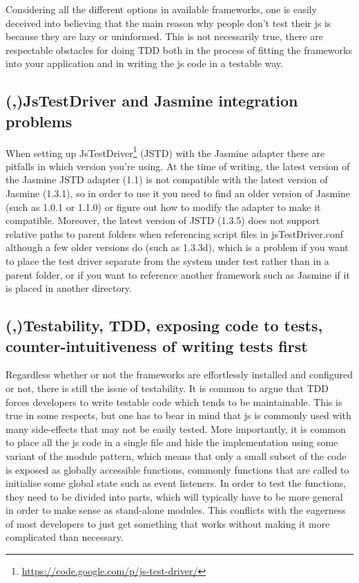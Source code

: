 \documentclass[11pt]{article}
\begin{document}
Considering all the different options in available frameworks, one is easily deceived into believing that the main reason why people don't test their \gls{js} is because they are lazy or uninformed. This is not necessarily true, there are respectable obstacles for doing TDD both in the process of fitting the frameworks into your application and in writing the \gls{js} code in a testable way.

\subsection{(,)JsTestDriver and Jasmine integration problems}
\label{subsec:jstestdriverintegration}

When setting up JsTestDriver\footnote{\url{https://code.google.com/p/js-test-driver/}} (JSTD) with the Jasmine adapter there are pitfalls in which version you're using. At the time of writing, the latest version of the Jasmine JSTD adapter (1.1) is not compatible with the latest version of Jasmine (1.3.1), so in order to use it you need to find an older version of Jasmine (such as 1.0.1 or 1.1.0) or figure out how to modify the adapter to make it compatible. Moreover, the latest version of JSTD (1.3.5) does not support relative paths to parent folders when referencing script files in jsTestDriver.conf although a few older versions do (such as 1.3.3d), which is a problem if you want to place the test driver separate from the system under test rather than in a parent folder, or if you want to reference another framework such as Jasmine if it is placed in another directory.

\subsection{(,)Testability, TDD, exposing code to tests, counter-intuitiveness of writing tests first}

Regardless whether or not the frameworks are effortlessly installed and configured or not, there is still the issue of testability. It is common to argue that TDD forces developers to write testable code which tends to be maintainable. This is true in some respects, but one has to bear in mind that \gls{js} is commonly used with many side-effects that may not be easily tested. More importantly, it is common to place all the \gls{js} code in a single file and hide the implementation using some variant of the module pattern\cite[p.~40]{GoodParts}, which means that only a small subset of the code is exposed as globally accessible functions, commonly functions that are called to initialise some global state such as event listeners. In order to test the functions, they need to be divided into parts, which will typically have to be more general in order to make sense as stand-alone modules. This conflicts with the eagerness of most developers to just get something that works without making it more complicated than necessary.
\end{document}
